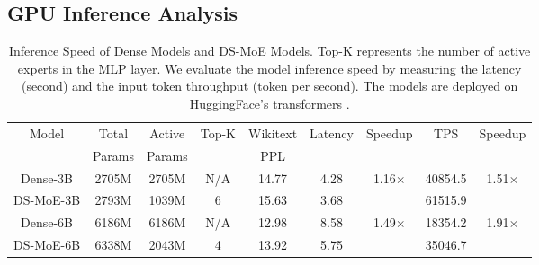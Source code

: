 \subsection{GPU Inference Analysis}\label{sec:inference}
\begin{table*}[h]
    \centering
    \small
    \caption{Inference Speed of Dense Models and DS-MoE Models. Top-K represents the number of active experts in the MLP layer. We evaluate the model inference speed by measuring the latency (second) and the input token throughput (token per second). The models are deployed on HuggingFace's transformers \cite{wolf2020transformers}.}
    \begin{adjustbox}{width=\textwidth,center}
    \begin{tabular}{c|cccc|cc|cc}
        \toprule
        \multirow{2}{*}{Model} & Total & Active & \multirow{2}{*}{Top-K} & Wikitext & \multirow{2}{*}{Latency} & \multirow{2}{*}{Speedup} & \multirow{2}{*}{TPS} & \multirow{2}{*}{Speedup} \\
         & Params & Params & & PPL & & & \\
        \midrule
        Dense-3B & 2705M & 2705M & N/A & 14.77 & 4.28 & \multirow{2}{*}{1.16$\times$} &  40854.5& \multirow{2}{*}{1.51$\times$} \\
        DS-MoE-3B & 2793M & 1039M & 6 & 15.63 & 3.68 & & 61515.9 \\
        \midrule
        Dense-6B & 6186M & 6186M & N/A & 12.98 & 8.58 & \multirow{2}{*}{1.49$\times$} & 18354.2 & \multirow{2}{*}{1.91$\times$} \\
        DS-MoE-6B & 6338M & 2043M & 4 & 13.92 & 5.75 &  & 35046.7 \\
        \bottomrule
    \end{tabular}
    \label{tab:latency}
    \end{adjustbox}
\end{table*}
